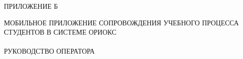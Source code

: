 \begin{flushright}
  ПРИЛОЖЕНИЕ Б
\end{flushright}
\vfill
\begin{center}
  \uppercase{
    Мобильное приложение сопровождения учебного процесса студентов в системе ОРИОКС\\~\\
    Руководство оператора
  }
\end{center}
\vfill

\setcounter{page}{1}
\thispagestyle{empty}
